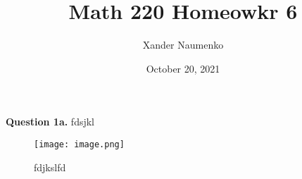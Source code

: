 \documentclass[letterpaper, reqno,11pt]{article}
\begin{document}
\title{Math 220 Homeowkr 6}
\date{October 20, 2021}
\author{Xander Naumenko}
\maketitle

{\noindent\bf Question 1a.} fdsjkl 

\begin{figure}[htbp]
\centering
\texttt{[image: image.png]}
\caption{fdjkslfd}
\label{fig:fdjsklf}
\end{figure}
\end{document}

